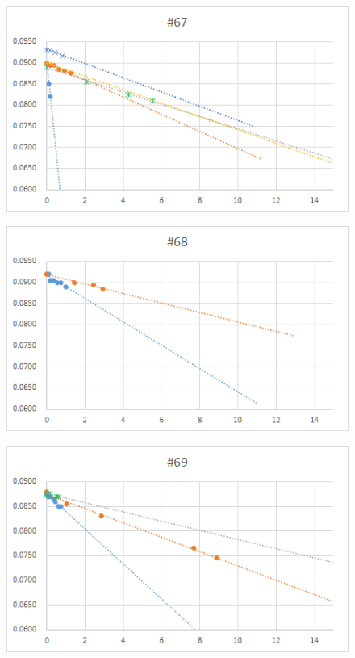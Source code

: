   \begin{figure}[htbp]
    \centering
       \includegraphics[width=120mm]{vol_067.png}
  \end{figure}
  \begin{figure}[htbp]
    \centering
       \includegraphics[width=120mm]{vol_068.png}
  \end{figure}
  \begin{figure}[htbp]
    \centering
       \includegraphics[width=120mm]{vol_069.png}
  \end{figure}
